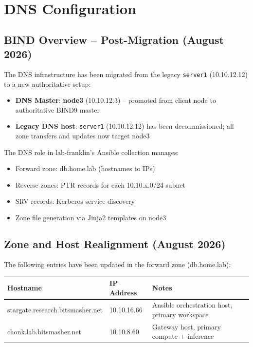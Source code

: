 \section{DNS Configuration}

\subsection{BIND Overview -- Post-Migration (August 2026)}

The DNS infrastructure has been migrated from the legacy \texttt{server1} (10.10.12.12) to a new authoritative setup:

\begin{itemize}
    \item \textbf{DNS Master}: \textbf{node3} (10.10.12.3) -- promoted from client node to authoritative BIND9 master
    
    \item \textbf{Legacy DNS host}: \texttt{server1} (10.10.12.12) has been decommissioned; all zone transfers and updates now target node3
\end{itemize}

The DNS role in lab-franklin's Ansible collection manages:
\begin{itemize}
    \item Forward zone: db.home.lab (hostnames to IPs)
    \item Reverse zones: PTR records for each 10.10.x.0/24 subnet
    \item SRV records: Kerberos service discovery
    \item Zone file generation via Jinja2 templates on node3
\end{itemize}

\subsection{Zone and Host Realignment (August 2026)}

The following entries have been updated in the forward zone (db.home.lab):

\begin{center}
\begin{tabular}{lll}
\hline
\textbf{Hostname} & \textbf{IP Address} & \textbf{Notes} \\ \hline
stargate.research.bitsmasher.net & 10.10.16.66 & Ansible orchestration host, primary workspace \\
chonk.lab.bitsmasher.net & 10.10.8.60 & Gateway host, primary compute + inference \\ \hline
\end{tabular}
\end{center}

